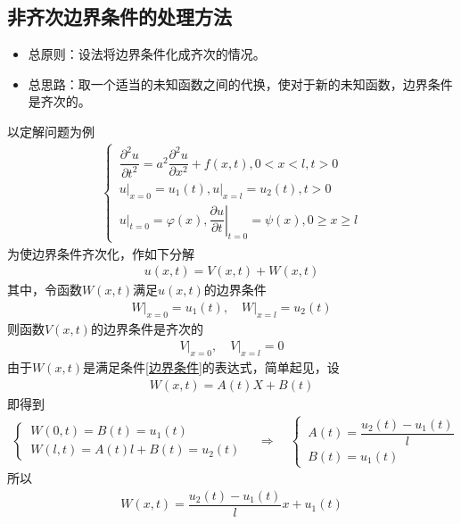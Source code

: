 \subsection{非齐次边界条件的处理方法}
\begin{itemize}
	\item 总原则：设法将边界条件化成齐次的情况。
	\item 总思路：取一个适当的未知函数之间的代换，使对于新的未知函数，边界条件是齐次的。
\end{itemize}
\noindent 以定解问题为例
\begin{align}
	\begin{cases}
		\, \dfrac{\partial^2 u}{\partial t^2} = a^2 \dfrac{\partial^2 u}{\partial x^2} + f(x,t), 0<x<l,t>0 \\[0.5em]
		\, \left. u \right|_{x = 0} =u_1(t),  \left. u \right|_{x = l} = u_2(t), t>0\\[0.5em]
		\, \left. u \right|_{t = 0} = \varphi(x), \left. \dfrac{\partial u}{\partial t}\right|_{t = 0} = \psi(x), 0 \ge x \ge l
	\end{cases}
\end{align}
为使边界条件齐次化，作如下分解
\begin{align}
	u(x,t) = V(x,t) + W(x,t)
\end{align}
其中，令函数$W(x,t)$满足$u(x, t)$的边界条件
\begin{align}
	\left. W \right|_{x = 0} = u_1(t),\quad \left. W \right|_{x = l} = u_2(t)
	\label{边界条件}
\end{align}
则函数$V(x,t)$的边界条件是齐次的
\begin{align*}
	\left. V \right|_{x = 0}, \quad \left. V \right|_{x = l} = 0
\end{align*}
由于$W(x,t)$是满足条件\eqref{边界条件}的表达式，简单起见，设
\begin{align}
	W(x,t)= A(t)X + B(t)
\end{align}
即得到
\begin{align*}
	\begin{cases}
		\, W(0,t) = B(t) = u_1(t)\\
		\, W(l ,t) = A(t) l + B(t) = u_2 (t)
	\end{cases}
\quad \Longrightarrow \quad
\begin{cases}
	\, A(t) = \dfrac{u_2(t) - u_1(t)}{l}\\
	\, B(t) = u_1(t)
\end{cases}
\end{align*}
所以
\begin{align}
		W(x,t)= \dfrac{u_2(t) - u_1(t)}{l}x + u_1(t)
\end{align}

